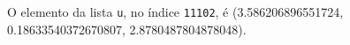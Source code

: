 \documentclass[12pt,varwidth=16cm,border=1pt]{standalone}
\begin{document}
O elemento da lista \verb+u+, no índice \verb+11102+, é (3.586206896551724, 0.18633540372670807, 2.8780487804878048).

\questiomtrue
\end{document}
